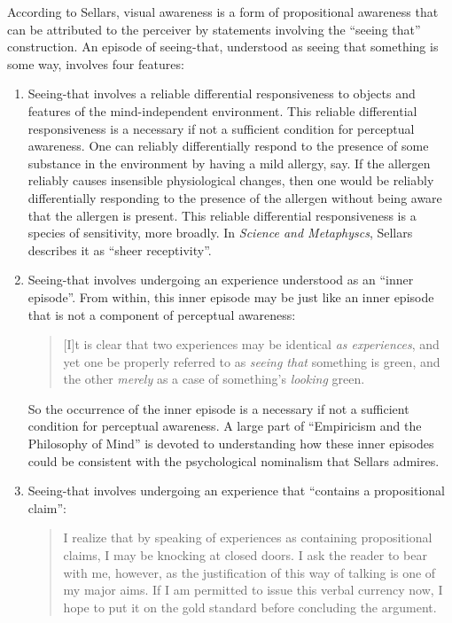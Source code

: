 \documentclass[12pt]{article}
\begin{document}
According to Sellars, visual awareness is a form of propositional awareness that can be attributed to the perceiver by statements involving the ``seeing that'' construction. An episode of seeing-that, understood as seeing that something is some way, involves four features:
\begin{enumerate}
    \item Seeing-that involves a reliable differential responsiveness to objects and features of the mind-independent environment. This reliable differential responsiveness is a necessary if not a sufficient condition for perceptual awareness. One can reliably differentially respond to the presence of some substance in the environment by having a mild allergy, say. If the allergen reliably causes insensible physiological changes, then one would be reliably differentially responding to the presence of the allergen without being aware that the allergen is present. This reliable differential responsiveness is a species of sensitivity, more broadly. In \emph{Science and Metaphyscs}, Sellars describes it as ``sheer receptivity''.
    \item Seeing-that involves undergoing an experience understood as an ``inner episode''. From within, this inner episode may be just like an inner episode that is not a component of perceptual awareness:
    \begin{quote}
        [I]t is clear that two experiences may be identical \emph{as experiences}, and yet one be properly referred to as \emph{seeing that} something is green, and the other \emph{merely} as a case of something's \emph{looking} green.
    \end{quote}
    So the occurrence of the inner episode is a necessary if not a sufficient condition for perceptual awareness. A large part of ``Empiricism and the Philosophy of Mind'' is devoted to understanding how these inner episodes could be consistent with the psychological nominalism that Sellars admires.
    \item Seeing-that involves undergoing an experience that ``contains a propositional claim'':
    \begin{quote}
        I realize that by speaking of experiences as containing propositional claims, I may be knocking at closed doors. I ask the reader to bear with me, however, as the justification of this way of talking is one of my major aims. If I am permitted to issue this verbal currency now, I hope to put it on the gold standard before concluding the argument.
    \end{quote}

\end{enumerate}
\end{document}

